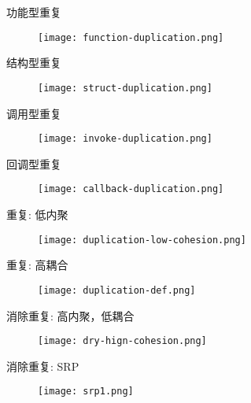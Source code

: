 \begin{frame}[fragile]{功能型重复}
  \begin{figure}
    \centering
    \texttt{[image: function-duplication.png]}
  \end{figure}
\end{frame}

\begin{frame}[fragile]{结构型重复}
  \begin{figure}
    \centering
    \texttt{[image: struct-duplication.png]}
  \end{figure}
\end{frame}

\begin{frame}[fragile]{调用型重复}
  \begin{figure}
    \centering
    \texttt{[image: invoke-duplication.png]}
  \end{figure}
\end{frame}

\begin{frame}[fragile]{回调型重复}
  \begin{figure}
    \centering
    \texttt{[image: callback-duplication.png]}
  \end{figure}
\end{frame}

\begin{frame}[fragile]{重复: 低内聚}
  \begin{figure}
    \centering
    \texttt{[image: duplication-low-cohesion.png]}
  \end{figure}
\end{frame}

\begin{frame}[fragile]{重复: 高耦合}
  \begin{figure}
    \centering
    \texttt{[image: duplication-def.png]}
  \end{figure}
\end{frame}

\begin{frame}[fragile]{消除重复: 高内聚，低耦合}
  \begin{figure}
    \centering
    \texttt{[image: dry-hign-cohesion.png]}
  \end{figure}
\end{frame}

\begin{frame}[fragile]{消除重复: SRP}
  \begin{figure}
    \centering
    \texttt{[image: srp1.png]}
  \end{figure}
\end{frame}

